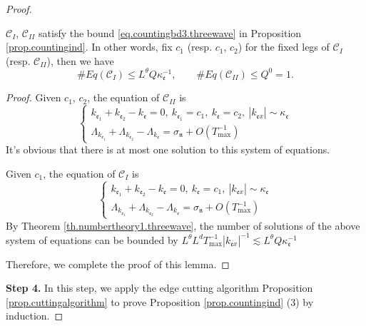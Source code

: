 \begin{proof}
\begin{lem}\label{lem.countingbdunit}
$\mathcal{C}_{I}$, $\mathcal{C}_{II}$ satisfy the bound \eqref{eq.countingbd3.threewave} in Proposition \ref{prop.countingind}. In other words, fix $c_1$ (resp. $c_1$, $c_2$) for the fixed legs of $\mathcal{C}_{I}$ (resp. $\mathcal{C}_{II}$), then we have 
\begin{equation}\label{eq.countingbdunit.threewave}
    \# Eq(\mathcal{C}_{I})\leq L^\theta Q\kappa^{-1}_{\mathfrak{e}},\qquad \# Eq(\mathcal{C}_{II})\leq Q^0=1.
\end{equation}
\end{lem}
\begin{proof} Given $c_1$, $c_2$, the equation of $\mathcal{C}_{II}$ is 
\begin{equation}
    \begin{cases}
    k_{\mathfrak{e}_1}+k_{\mathfrak{e}_2}-k_{\mathfrak{e}}=0,\ k_{\mathfrak{e}_1}=c_1,\ k_{\mathfrak{e}}=c_2,\ |k_{\mathfrak{e}x}|\sim \kappa_{\mathfrak{e}}
    \\
    \Lambda_{k_{\mathfrak{e}_1}}+\Lambda_{k_{\mathfrak{e}_2}}-\Lambda_{k_{\mathfrak{e}}}=\sigma_{\mathfrak{n}}+O(T^{-1}_{\text{max}})
    \end{cases}
\end{equation}
It's obvious that there is at most one solution to this system of equations.

Given $c_1$, the equation of $\mathcal{C}_{I}$ is 
\begin{equation}
    \begin{cases}
    k_{\mathfrak{e}_1}+k_{\mathfrak{e}_2}-k_{\mathfrak{e}}=0,\ k_{\mathfrak{e}}=c_1,\ |k_{\mathfrak{e}x}|\sim \kappa_{\mathfrak{e}}
    \\
    \Lambda_{k_{\mathfrak{e}_1}}+\Lambda_{k_{\mathfrak{e}_2}}-\Lambda_{k_{\mathfrak{e}}}=\sigma_{\mathfrak{n}}+O(T^{-1}_{\text{max}})
    \end{cases}
\end{equation}
By Theorem \ref{th.numbertheory1.threewave}, the number of solutions of the above system of equations can be bounded by $L^\theta L^dT^{-1}_{\text{max}}|k_{\mathfrak{e}x}|^{-1}\lesssim L^\theta Q\kappa^{-1}_{\mathfrak{e}}$

Therefore, we complete the proof of this lemma.
\end{proof}



\textbf{Step 4.} In this step, we apply the edge cutting algorithm Proposition \ref{prop.cuttingalgorithm} to prove Proposition \ref{prop.countingind} (3) by induction.


\end{proof}
